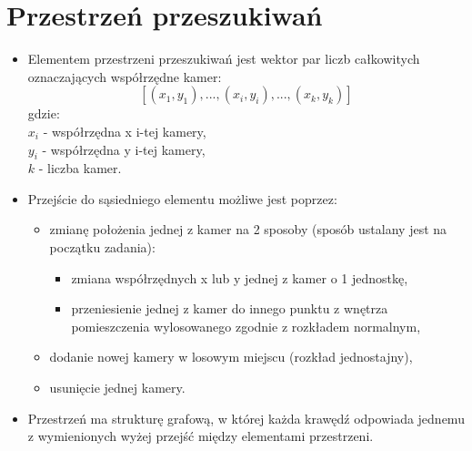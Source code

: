 \documentclass[12pt,a4paper]{article}
\begin{document}
\section{Przestrzeń przeszukiwań}
\begin{itemize}
	\item Elementem przestrzeni przeszukiwań jest wektor par liczb całkowitych oznaczających współrzędne kamer:\\
	$$[(x_1, y_1), ..., (x_i, y_i), ..., (x_k, y_k)]$$
	gdzie:\\
	$x_i$ - współrzędna x i-tej kamery,\\
	$y_i$ - współrzędna y i-tej kamery,\\
	$k$ - liczba kamer.
	\item Przejście do sąsiedniego elementu możliwe jest poprzez:
	\begin{itemize}
		\item zmianę położenia jednej z kamer na 2 sposoby (sposób
		ustalany jest na początku zadania):
		\begin{itemize}
		\item zmiana współrzędnych x lub y jednej z kamer o 1 jednostkę,
		\item przeniesienie jednej z kamer do innego punktu z wnętrza pomieszczenia
		wylosowanego zgodnie z rozkładem normalnym,
		\end{itemize}
		\item dodanie nowej kamery w losowym miejscu (rozkład jednostajny),
		\item usunięcie jednej kamery.
	\end{itemize}
	\item Przestrzeń ma strukturę grafową, w której każda krawędź odpowiada
	jednemu z wymienionych wyżej przejść między elementami przestrzeni.
\end{itemize}
\end{document}
